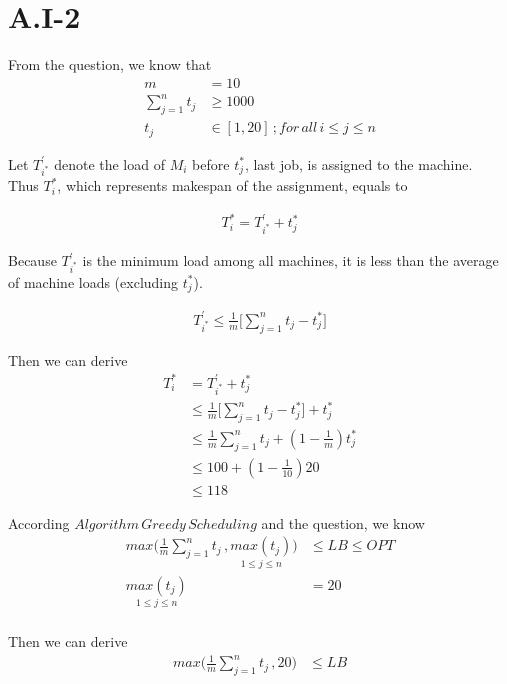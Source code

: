 \section*{A.I-2}
\label{sec:approx-1-2}

From the question, we know that
\begin{align*}
m &= 10\\
\sum\limits_{j=1}^n t_j &\ge 1000 \\
t_j  &\in [1,20] \,; for \, all \, i \le j \le n 
\end{align*}

Let $T^{\prime}_{i^*}$ denote the load of $M_i$ before $t_j^*$, last job, is assigned to the machine. \\
Thus $T_i^*$, which represents makespan of the assignment, equals to

\begin{align*}
T_i^* = T^{\prime}_{i^*} + t_j^*
\end{align*}

Because $T^{\prime}_{i^*}$ is the minimum load among all machines, it is less than the average of machine loads (excluding $t^*_j$).

\begin{align*}
T^{\prime}_{i^*} \le \frac{1}{m} \bigg[ \sum\limits_{j=1}^n t_j - t_j^*  \bigg] 
\end{align*}

Then we can derive
\begin{align*}
T_i^* &= T^{\prime}_{i^*} + t_j^* \\
&\le \frac{1}{m} \bigg[ \sum\limits_{j=1}^n t_j - t_j^*  \bigg] + t_j^* \\
&\le \frac{1}{m} \sum\limits_{j=1}^n t_j + ( 1 - \frac{1}{m} ) t_j^* \\
&\le 100 + ( 1 - \frac{1}{10} ) 20 \\
&\le 118
\end{align*}

According $Algorithm\, Greedy\, Scheduling$ and the question, we know
\begin{align*}
max \bigg( \frac{1}{m}\sum\limits_{j=1}^n t_j \, , \underset{1\le j \le n }{max(t_j) }\bigg) &\le LB \le OPT \\
\underset{1\le j \le n }{max(t_j)} &= 20 \\
\end{align*}

Then we can derive
\begin{align*}
max \bigg( \frac{1}{m}\sum\limits_{j=1}^n t_j \, , 20 \bigg) &\le LB
\end{align*}

